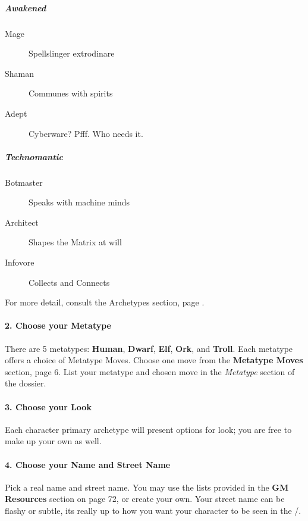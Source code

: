 \documentclass[oneside,10pt]{article}
\begin{document}
\begin{multicols}{2}
\subparagraph{Awakened}

\begin{dent}
\begin{description}
\item[Mage] Spellslinger extrodinare
\item[Shaman] Communes with spirits
\item[Adept] Cyberware? Pfff. Who needs it.
\end{description}
\end{dent}

\subparagraph{Technomantic}

\begin{dent}
\begin{description}
\item[Botmaster] Speaks with machine minds
\item[Architect] Shapes the Matrix at will
\item[Infovore] Collects and Connects
\end{description}
\end{dent}

For more detail, consult the Archetypes section, page \pageref{archetypes}.

\paragraph{2.  Choose your Metatype}

There are 5 metatypes: \textbf{Human}, \textbf{Dwarf}, \textbf{Elf}, \textbf{Ork}, and \textbf{Troll}.
Each metatype offers a choice of Metatype Moves. Choose
one move from the \textbf{Metatype Moves} section, page 6. List your
metatype and chosen move in the \textit{Metatype} section of the dossier.

\paragraph{3.  Choose your Look}

Each character primary archetype will present options for look; you
are free to make up your own as well.

\paragraph{4.  Choose your Name and Street Name}

Pick a real name and street name. You may use the lists provided in the \textbf{GM Resources} section on page 72, or create
your own. Your street name can be flashy or subtle, its really up to
how you want your character to be seen in the \SW/.


\end{multicols}
\end{document}
